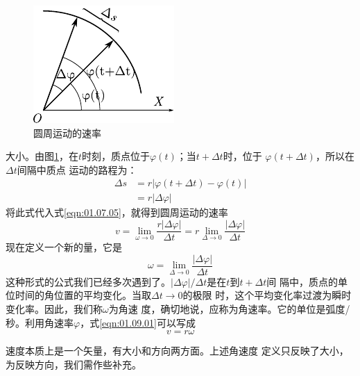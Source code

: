 \begin{figure}
    \vspace{-0.5em}
    \centering \small
    \includegraphics{figure/fig01.18}
    \caption{圆周运动的速率}
    \label{fig:01.18}
\end{figure}
\noindent 大小。由图\ref{fig:01.18}，在$t$时刻，质点位于$\varphi(t)$；当$t+\Delta t$时，位于
$\varphi(t+\Delta t)$，所以在$\Delta t$间隔中质点
运动的路程为：
\setlength{\mathindent}{2em}
\begin{equation*}
    \begin{aligned}
        \Delta s &=r|\varphi(t+\Delta t)-\varphi(t)| \\
        &=r|\Delta \varphi|
    \end{aligned}
\end{equation*}
将此式代入式\eqref{eqn:01.07.05}，就得到圆周运动的速率\vspace{-0.7em}
\setlength{\mathindent}{6em}
\begin{equation}\label{eqn:01.09.01}
    v=\lim _{\omega \rightarrow 0} \frac{r|\Delta \varphi|}{\Delta t}=r \lim _{\Delta \rightarrow 0} \frac{|\Delta \varphi|}{\Delta t}
\end{equation}
现在定义一个新的量，它是
\begin{equation}\label{eqn:01.09.02}
    \omega=\lim _{\Delta \rightarrow 0} \frac{|\Delta \varphi|}{\Delta t}
\end{equation}
这种形式的公式我们已经多次遇到了。$|\Delta\varphi|/\Delta t$是在$t$到$t+\Delta t$间
隔中，质点的单位时间的角位置的平均变化。当取$\Delta t\rightarrow 0$的极限
时，这个平均变化率过渡为瞬时变化率。因此，我们称$\omega$为角速
度，确切地说，应称为角速率。它的单位是弧度/秒。利用角速率$\varphi$，式\eqref{eqn:01.09.01}可以写成
\begin{equation}\label{eqn:01.09.03}
    v=r\omega
\end{equation}

速度本质上是一个矢量，有大小和方向两方面。上述角速度
定义只反映了大小，为反映方向，我们需作些补充。

